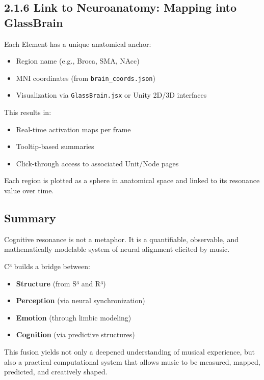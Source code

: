 \subsection*{2.1.6 Link to Neuroanatomy: Mapping into GlassBrain}

Each Element has a unique anatomical anchor:

\begin{itemize}
    \item Region name (e.g., Broca, SMA, NAcc)
    \item MNI coordinates (from \texttt{brain\_coords.json})
    \item Visualization via \texttt{GlassBrain.jsx} or Unity 2D/3D interfaces
\end{itemize}

This results in:

\begin{itemize}
    \item Real-time activation maps per frame
    \item Tooltip-based summaries
    \item Click-through access to associated Unit/Node pages
\end{itemize}

Each region is plotted as a sphere in anatomical space and linked to its resonance value over time.

\subsection*{Summary}

Cognitive resonance is not a metaphor. It is a quantifiable, observable, and mathematically modelable system of neural alignment elicited by music.

C³ builds a bridge between:

\begin{itemize}
    \item \textbf{Structure} (from S³ and R³)
    \item \textbf{Perception} (via neural synchronization)
    \item \textbf{Emotion} (through limbic modeling)
    \item \textbf{Cognition} (via predictive structures)
\end{itemize}

This fusion yields not only a deepened understanding of musical experience, but also a practical computational system that allows music to be measured, mapped, predicted, and creatively shaped.

